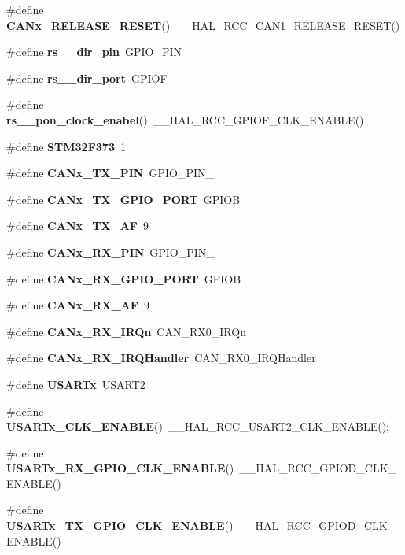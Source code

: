 \begin{DoxyCompactItemize}
\item 
\#define \textbf{ C\+A\+Nx\+\_\+\+R\+E\+L\+E\+A\+S\+E\+\_\+\+R\+E\+S\+ET}()~\+\_\+\+\_\+\+H\+A\+L\+\_\+\+R\+C\+C\+\_\+\+C\+A\+N1\+\_\+\+R\+E\+L\+E\+A\+S\+E\+\_\+\+R\+E\+S\+ET()
\item 
\#define \textbf{ rs\+\_\+\_\+dir\+\_\+pin}~G\+P\+I\+O\+\_\+\+P\+I\+N\+\_
\item 
\#define \textbf{ rs\+\_\+\_\+dir\+\_\+port}~G\+P\+I\+OF
\item 
\#define \textbf{ rs\+\_\+\_\+pon\+\_\+clock\+\_\+enabel}()~\+\_\+\+\_\+\+H\+A\+L\+\_\+\+R\+C\+C\+\_\+\+G\+P\+I\+O\+F\+\_\+\+C\+L\+K\+\_\+\+E\+N\+A\+B\+LE()
\item 
\#define \textbf{ S\+T\+M32\+F373}~1
\item 
\#define \textbf{ C\+A\+Nx\+\_\+\+T\+X\+\_\+\+P\+IN}~G\+P\+I\+O\+\_\+\+P\+I\+N\+\_
\item 
\#define \textbf{ C\+A\+Nx\+\_\+\+T\+X\+\_\+\+G\+P\+I\+O\+\_\+\+P\+O\+RT}~G\+P\+I\+OB
\item 
\#define \textbf{ C\+A\+Nx\+\_\+\+T\+X\+\_\+\+AF}~9
\item 
\#define \textbf{ C\+A\+Nx\+\_\+\+R\+X\+\_\+\+P\+IN}~G\+P\+I\+O\+\_\+\+P\+I\+N\+\_
\item 
\#define \textbf{ C\+A\+Nx\+\_\+\+R\+X\+\_\+\+G\+P\+I\+O\+\_\+\+P\+O\+RT}~G\+P\+I\+OB
\item 
\#define \textbf{ C\+A\+Nx\+\_\+\+R\+X\+\_\+\+AF}~9
\item 
\#define \textbf{ C\+A\+Nx\+\_\+\+R\+X\+\_\+\+I\+R\+Qn}~C\+A\+N\+\_\+\+R\+X0\+\_\+\+I\+R\+Qn
\item 
\#define \textbf{ C\+A\+Nx\+\_\+\+R\+X\+\_\+\+I\+R\+Q\+Handler}~C\+A\+N\+\_\+\+R\+X0\+\_\+\+I\+R\+Q\+Handler
\item 
\#define \textbf{ U\+S\+A\+R\+Tx}~U\+S\+A\+R\+T2
\item 
\#define \textbf{ U\+S\+A\+R\+Tx\+\_\+\+C\+L\+K\+\_\+\+E\+N\+A\+B\+LE}()~\+\_\+\+\_\+\+H\+A\+L\+\_\+\+R\+C\+C\+\_\+\+U\+S\+A\+R\+T2\+\_\+\+C\+L\+K\+\_\+\+E\+N\+A\+B\+LE();
\item 
\#define \textbf{ U\+S\+A\+R\+Tx\+\_\+\+R\+X\+\_\+\+G\+P\+I\+O\+\_\+\+C\+L\+K\+\_\+\+E\+N\+A\+B\+LE}()~\+\_\+\+\_\+\+H\+A\+L\+\_\+\+R\+C\+C\+\_\+\+G\+P\+I\+O\+D\+\_\+\+C\+L\+K\+\_\+\+E\+N\+A\+B\+LE()
\item 
\#define \textbf{ U\+S\+A\+R\+Tx\+\_\+\+T\+X\+\_\+\+G\+P\+I\+O\+\_\+\+C\+L\+K\+\_\+\+E\+N\+A\+B\+LE}()~\+\_\+\+\_\+\+H\+A\+L\+\_\+\+R\+C\+C\+\_\+\+G\+P\+I\+O\+D\+\_\+\+C\+L\+K\+\_\+\+E\+N\+A\+B\+LE()
\item 

\end{DoxyCompactItemize}
